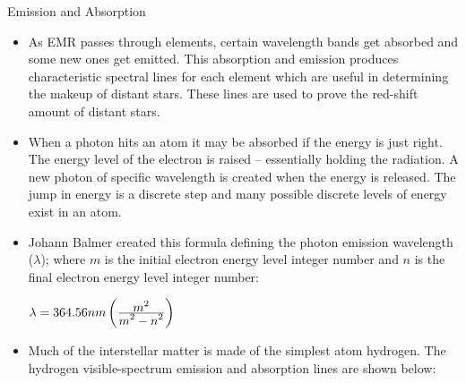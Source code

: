 {\Large Emission and Absorption}
\begin{itemize}


\item As EMR passes through elements, certain wavelength bands get absorbed and some new ones get emitted. This absorption and emission produces characteristic spectral lines for each element which are useful in determining the makeup of distant stars. These lines are used to prove the red-shift amount of distant stars.

\item
 When a photon hits an atom it may be absorbed if the energy is just right.
 The energy level of the electron is raised -- essentially holding the radiation.
 A new photon of specific wavelength is created when the energy is released.
 The jump in energy is a discrete step and many possible discrete levels of energy exist in an atom.

\item \begin{minipage}[t]{3.5in} Johann Balmer created this formula defining the photon emission wavelength ($\lambda$); where $m$ is the initial electron energy level integer number and $n$ is the final electron energy level integer number: \end{minipage}%
\hspace{0.2in}
\begin{minipage}[t]{1.5in}\vspace{0.01in}
	$\lambda = 364.56nm \left( \frac{\displaystyle m^2}{\displaystyle m^2 - n^2} \right)$
\end{minipage}

\vspace{0.02in}

\item Much of the interstellar matter is made of the simplest atom hydrogen. The hydrogen visible-spectrum emission and absorption lines are shown below:

\end{itemize}



